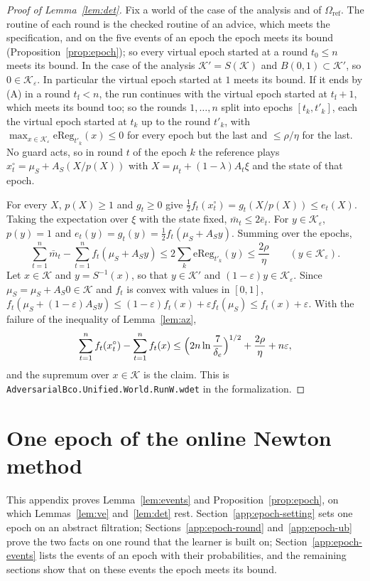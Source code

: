 \documentclass[11pt]{amsart}
\theoremstyle{definition}
\numberwithin{equation}{section}
\newcommand{\cK}{\mathcal{K}}
\begin{document}
\begin{proof}[Proof of Lemma~\ref{lem:det}]
Fix a world of the case of the analysis and of $\Omega_{\mathrm{ref}}$. The routine of each round is the checked routine of an advice, which meets the specification, and on the five events of an epoch the epoch meets its bound (Proposition~\ref{prop:epoch}); so every virtual epoch started at a round $t_0\le n$ meets its bound. In the case of the analysis $\cK'=S(\cK)$ and $B(0,1)\subset\cK'$, so $0\in\cK_\varepsilon$. In particular the virtual epoch started at $1$ meets its bound. If it ends by (A) in a round $t_{\mathrm f}<n$, the run continues with the virtual epoch started at $t_{\mathrm f}+1$, which meets its bound too; so the rounds $1,\dots,n$ split into epochs $[t_k,t'_k]$, each the virtual epoch started at $t_k$ up to the round $t'_k$, with $\max_{x\in\cK_\varepsilon}\mathrm{eReg}_{t'_k}(x)\le0$ for every epoch but the last and $\le\rho/\eta$ for the last. No guard acts, so in round $t$ of the epoch $k$ the reference plays $x^\circ_t=\mu_S+A_S(X/p(X))$ with $X=\mu_t+(1-\lambda)A_t\xi$ and the state of that epoch.

For every $X$, $p(X)\ge1$ and $g_t\ge0$ give $\frac12f_t(x^\circ_t)=g_t(X/p(X))\le e_t(X)$. Taking the expectation over $\xi$ with the state fixed, $\bar m_t\le2\bar e_t$. For $y\in\cK_\varepsilon$, $p(y)=1$ and $e_t(y)=g_t(y)=\frac12f_t(\mu_S+A_Sy)$. Summing over the epochs,
\[
\sum_{t=1}^n\bar m_t-\sum_{t=1}^nf_t(\mu_S+A_Sy)\le2\sum_k\mathrm{eReg}_{t'_k}(y)\le\frac{2\rho}\eta\qquad(y\in\cK_\varepsilon).
\]
Let $x\in\cK$ and $y=S^{-1}(x)$, so that $y\in\cK'$ and $(1-\varepsilon)y\in\cK_\varepsilon$. Since $\mu_S=\mu_S+A_S0\in\cK$ and $f_t$ is convex with values in $[0,1]$, $f_t(\mu_S+(1-\varepsilon)A_Sy)\le(1-\varepsilon)f_t(x)+\varepsilon f_t(\mu_S)\le f_t(x)+\varepsilon$. With the failure of the inequality of Lemma~\ref{lem:az},
\[
\sum_{t=1}^nf_t(x^\circ_t)-\sum_{t=1}^nf_t(x)\le\Bigl(2n\ln\frac7{\delta_e}\Bigr)^{1/2}+\frac{2\rho}\eta+n\varepsilon,
\]
and the supremum over $x\in\cK$ is the claim.
This is \texttt{AdversarialBco.Unified.World.RunW.wdet} in the formalization.
\end{proof}

\section{One epoch of the online Newton method}\label{app:epoch}

This appendix proves Lemma~\ref{lem:events} and Proposition~\ref{prop:epoch}, on which Lemmas~\ref{lem:ve} and~\ref{lem:det} rest. Section~\ref{app:epoch-setting} sets one epoch on an abstract filtration; Sections~\ref{app:epoch-round} and~\ref{app:epoch-ub} prove the two facts on one round that the learner is built on; Section~\ref{app:epoch-events} lists the events of an epoch with their probabilities, and the remaining sections show that on these events the epoch meets its bound.
\end{document}
